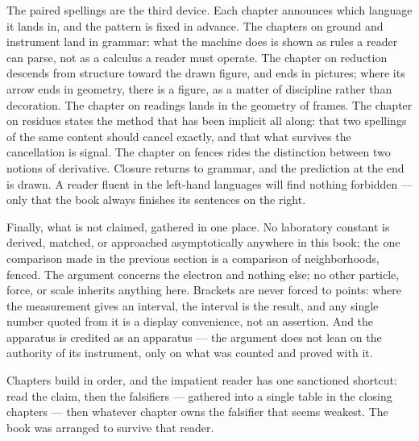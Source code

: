 The paired spellings are the third device. Each chapter announces which language it
lands in, and the pattern is fixed in advance. The chapters on ground and instrument
land in grammar: what the machine does is shown as rules a reader can parse, not as a
calculus a reader must operate. The chapter on reduction descends from structure toward
the drawn figure, and ends in pictures; where its arrow ends in geometry, there is a
figure, as a matter of discipline rather than decoration. The chapter on readings lands
in the geometry of frames. The chapter on residues states the method that has been
implicit all along: that two spellings of the same content should cancel exactly, and
that what survives the cancellation is signal. The chapter on fences rides the
distinction between two notions of derivative. Closure returns to grammar, and the
prediction at the end is drawn. A reader fluent in the left-hand languages will find
nothing forbidden --- only that the book always finishes its sentences on the right.

Finally, what is not claimed, gathered in one place. No laboratory constant is derived,
matched, or approached asymptotically anywhere in this book; the one comparison made in
the previous section is a comparison of neighborhoods, fenced. The argument concerns the
electron and nothing else; no other particle, force, or scale inherits anything here.
Brackets are never forced to points: where the measurement gives an interval, the
interval is the result, and any single number quoted from it is a display convenience,
not an assertion. And the apparatus is credited as an apparatus --- the argument does
not lean on the authority of its instrument, only on what was counted and proved with
it.

Chapters build in order, and the impatient reader has one sanctioned shortcut: read the
claim, then the falsifiers --- gathered into a single table in the closing chapters ---
then whatever chapter owns the falsifier that seems weakest. The book was arranged to
survive that reader.
